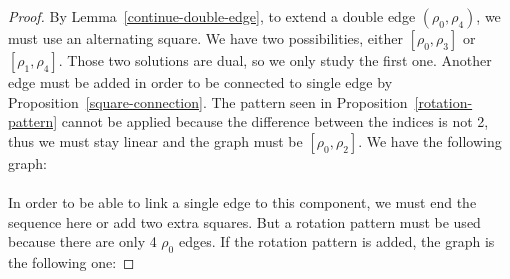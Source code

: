 \begin{proof}
  By Lemma~\ref{continue-double-edge}, to extend a double edge $(\rho_0, \rho_4)$, we must use an alternating square. We have two possibilities, either $[\rho_0, \rho_3]$ or $[\rho_1, \rho_4]$. Those two solutions are dual, so we only study the first one. Another edge must be added in order to be connected to single edge by Proposition~\ref{square-connection}. The pattern seen in Proposition~\ref{rotation-pattern} cannot be applied because the difference between the indices is not 2, thus we must stay linear and the graph must be $[\rho_0, \rho_2]$. We have the following graph:

  \begin{figure}[H]
    \begin{center}
      \caption{}
    \end{center}
  \end{figure}

  \paragraph{}
  In order to be able to link a single edge to this component, we must end the sequence here or add two extra squares. But a rotation pattern must be used because there are only 4 $\rho_0$ edges. If the rotation pattern is added, the graph is the following one:


\end{proof}
